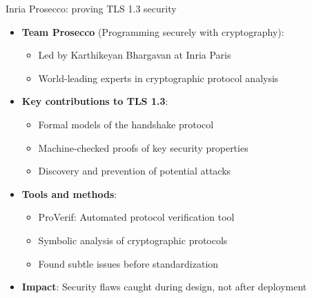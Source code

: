 \ifdefined\PRESENTATION\else\PassOptionsToClass{handout}{beamer}\fi\documentclass[aspectratio=169, lualatex]{beamer}
\begin{document}
\begin{frame}{Inria Prosecco: proving TLS 1.3 security}
	\begin{itemize}
		\item \textbf{Team Prosecco} (Programming securely with cryptography):
		      \begin{itemize}
			      \item Led by Karthikeyan Bhargavan at Inria Paris
			      \item World-leading experts in cryptographic protocol analysis
		      \end{itemize}
		\item \textbf{Key contributions to TLS 1.3}:
		      \begin{itemize}
			      \item Formal models of the handshake protocol
			      \item Machine-checked proofs of key security properties
			      \item Discovery and prevention of potential attacks
		      \end{itemize}
		\item \textbf{Tools and methods}:
		      \begin{itemize}
			      \item ProVerif: Automated protocol verification tool
			      \item Symbolic analysis of cryptographic protocols
			      \item Found subtle issues before standardization
		      \end{itemize}
		\item \textbf{Impact}: Security flaws caught during design, not after deployment
	\end{itemize}
\end{frame}
\end{document}

